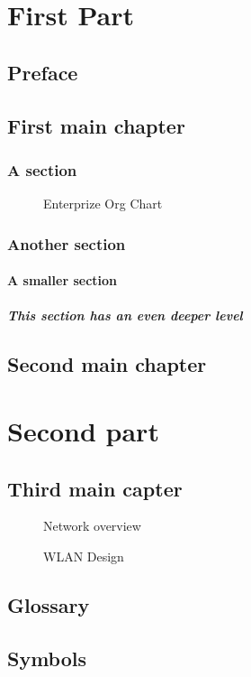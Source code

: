 \documentclass{book}
\begin{document}
\tableofcontents
\listoffigures

\part{First Part}
\chapter{Preface}

\chapter{First main chapter}

\section{A section} %
\begin{figure}
\centering
{}
\caption{Enterprize Org Chart}
\end{figure}

\section{Another section} %
\subsection{A smaller section} %
\subsubsection[Deeper level]{This section has an even deeper level} %
\chapter{Second main chapter}
\part{Second part} %
\chapter{Third main capter}
\begin{figure}
\centering
{}
\caption{Network overview}
\end{figure}
\begin{figure}
\centering
{}
\caption{WLAN Design}
\end{figure}

\appendix
\cleardoublepage
{}
\chapter{Glossary}
\chapter{Symbols}
\end{document}
